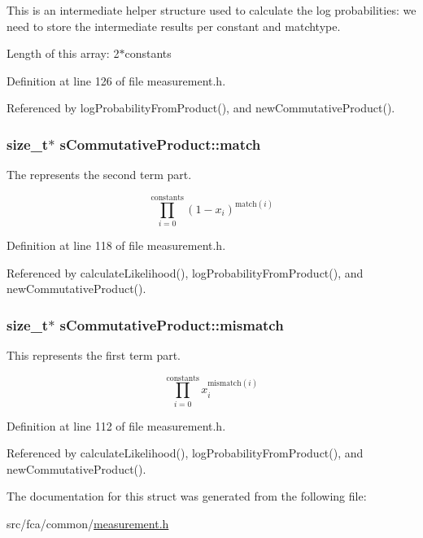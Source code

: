 \-This is an intermediate helper structure used to calculate the log probabilities\-: we need to store the intermediate results per constant and matchtype. 

\-Length of this array\-: 2$\ast$constants 

\-Definition at line 126 of file measurement.\-h.



\-Referenced by log\-Probability\-From\-Product(), and new\-Commutative\-Product().

\hypertarget{structsCommutativeProduct_ae78261dbaf0a6455774a84836fe7334d}{
\subsubsection[{match}]{\setlength{\rightskip}{0pt plus 5cm}size\-\_\-t$\ast$ {\bf s\-Commutative\-Product\-::match}}}\label{structsCommutativeProduct_ae78261dbaf0a6455774a84836fe7334d}


\-The represents the second term part. 

\[ \prod_{i=0}^{\mathrm{constants}} (1-x_i)^{\mathrm{match}(i)} \] 

\-Definition at line 118 of file measurement.\-h.



\-Referenced by calculate\-Likelihood(), log\-Probability\-From\-Product(), and new\-Commutative\-Product().

\hypertarget{structsCommutativeProduct_a95aa7c0ea80854b88afc16d913137f35}{
\subsubsection[{mismatch}]{\setlength{\rightskip}{0pt plus 5cm}size\-\_\-t$\ast$ {\bf s\-Commutative\-Product\-::mismatch}}}\label{structsCommutativeProduct_a95aa7c0ea80854b88afc16d913137f35}


\-This represents the first term part. 

\[ \prod_{i=0}^{\mathrm{constants}} x_i^{\mathrm{mismatch}(i)} \] 

\-Definition at line 112 of file measurement.\-h.



\-Referenced by calculate\-Likelihood(), log\-Probability\-From\-Product(), and new\-Commutative\-Product().



\-The documentation for this struct was generated from the following file\-:\begin{DoxyCompactItemize}
\item 
src/fca/common/\hyperlink{common_2measurement_8h}{measurement.\-h}\end{DoxyCompactItemize}
